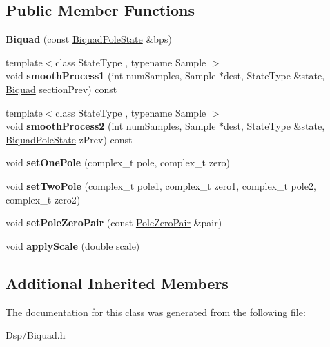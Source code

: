 \subsection*{Public Member Functions}
\begin{DoxyCompactItemize}
\item 
\hypertarget{classDsp_1_1Biquad_a00e7f43901cb411f7141d09619ff8295}{{\bfseries Biquad} (const \hyperlink{structDsp_1_1BiquadPoleState}{Biquad\-Pole\-State} \&bps)}\label{classDsp_1_1Biquad_a00e7f43901cb411f7141d09619ff8295}

\item 
\hypertarget{classDsp_1_1Biquad_adfe5de7e99b745c2369bb5dc9e27b7f8}{{\footnotesize template$<$class State\-Type , typename Sample $>$ }\\void {\bfseries smooth\-Process1} (int num\-Samples, Sample $\ast$dest, State\-Type \&state, \hyperlink{classDsp_1_1Biquad}{Biquad} section\-Prev) const }\label{classDsp_1_1Biquad_adfe5de7e99b745c2369bb5dc9e27b7f8}

\item 
\hypertarget{classDsp_1_1Biquad_aaff4d4bd815e9c04fb3346c980658f88}{{\footnotesize template$<$class State\-Type , typename Sample $>$ }\\void {\bfseries smooth\-Process2} (int num\-Samples, Sample $\ast$dest, State\-Type \&state, \hyperlink{structDsp_1_1BiquadPoleState}{Biquad\-Pole\-State} z\-Prev) const }\label{classDsp_1_1Biquad_aaff4d4bd815e9c04fb3346c980658f88}

\item 
\hypertarget{classDsp_1_1Biquad_aaa48701fdee63a3a7abc9f11914067ad}{void {\bfseries set\-One\-Pole} (complex\-\_\-t pole, complex\-\_\-t zero)}\label{classDsp_1_1Biquad_aaa48701fdee63a3a7abc9f11914067ad}

\item 
\hypertarget{classDsp_1_1Biquad_a25bf2501009c67aa22b9306cff76b4d9}{void {\bfseries set\-Two\-Pole} (complex\-\_\-t pole1, complex\-\_\-t zero1, complex\-\_\-t pole2, complex\-\_\-t zero2)}\label{classDsp_1_1Biquad_a25bf2501009c67aa22b9306cff76b4d9}

\item 
\hypertarget{classDsp_1_1Biquad_a0e24eeb534ccea5f3e023ffdc05f7932}{void {\bfseries set\-Pole\-Zero\-Pair} (const \hyperlink{structDsp_1_1PoleZeroPair}{Pole\-Zero\-Pair} \&pair)}\label{classDsp_1_1Biquad_a0e24eeb534ccea5f3e023ffdc05f7932}

\item 
\hypertarget{classDsp_1_1Biquad_aa419ac8a59a8daf165b18325a23ec645}{void {\bfseries apply\-Scale} (double scale)}\label{classDsp_1_1Biquad_aa419ac8a59a8daf165b18325a23ec645}

\end{DoxyCompactItemize}
\subsection*{Additional Inherited Members}


The documentation for this class was generated from the following file\-:\begin{DoxyCompactItemize}
\item 
Dsp/Biquad.\-h\end{DoxyCompactItemize}
